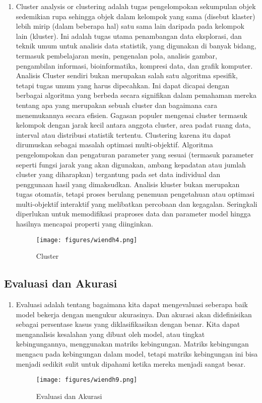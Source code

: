 \begin{enumerate}
\item Cluster analysis or clustering adalah tugas pengelompokan sekumpulan objek sedemikian rupa sehingga objek dalam kelompok yang sama (disebut klaster) lebih mirip (dalam beberapa hal) satu sama lain daripada pada kelompok lain (kluster). Ini adalah tugas utama penambangan data eksplorasi, dan teknik umum untuk analisis data statistik, yang digunakan di banyak bidang, termasuk pembelajaran mesin, pengenalan pola, analisis gambar, pengambilan informasi, bioinformatika, kompresi data, dan grafik komputer. Analisis Cluster sendiri bukan merupakan salah satu algoritma spesifik, tetapi tugas umum yang harus dipecahkan. Ini dapat dicapai dengan berbagai algoritma yang berbeda secara signifikan dalam pemahaman mereka tentang apa yang merupakan sebuah cluster dan bagaimana cara menemukannya secara efisien. Gagasan populer mengenai cluster termasuk kelompok dengan jarak kecil antara anggota cluster, area padat ruang data, interval atau distribusi statistik tertentu. Clustering karena itu dapat dirumuskan sebagai masalah optimasi multi-objektif. Algoritma pengelompokan dan pengaturan parameter yang sesuai (termasuk parameter seperti fungsi jarak yang akan digunakan, ambang kepadatan atau jumlah cluster yang diharapkan) tergantung pada set data individual dan penggunaan hasil yang dimaksudkan. Analisis kluster bukan merupakan tugas otomatis, tetapi proses berulang penemuan pengetahuan atau optimasi multi-objektif interaktif yang melibatkan percobaan dan kegagalan. Seringkali diperlukan untuk memodifikasi praproses data dan parameter model hingga hasilnya mencapai properti yang diinginkan.
\begin{figure}[ht]
\centering
\texttt{[image: figures/wiendh4.png]}
\caption{Cluster}
\label{contoh}
\end{figure}
\end{enumerate}

\subsection{Evaluasi dan Akurasi}
\begin{enumerate}
\item Evaluasi adalah tentang  bagaimana kita dapat mengevaluasi seberapa baik model bekerja dengan mengukur akurasinya. Dan akurasi akan didefinisikan sebagai persentase kasus yang diklasifikasikan dengan benar. Kita dapat menganalisis kesalahan yang dibuat oleh model, atau tingkat kebingungannya, menggunakan matriks kebingungan. Matriks kebingungan mengacu pada kebingungan dalam model, tetapi matriks kebingungan ini bisa menjadi sedikit sulit untuk dipahami ketika mereka menjadi sangat besar.
\begin{figure}[ht]
\centering
\texttt{[image: figures/wiendh9.png]}
\caption{ Evaluasi dan Akurasi}
\label{contoh}
\end{figure}
\end{enumerate}

